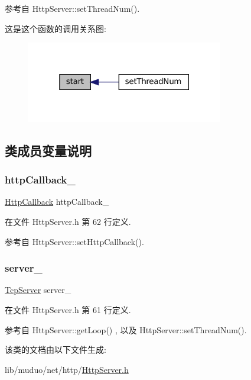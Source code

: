 参考自 Http\+Server\+::set\+Thread\+Num().

这是这个函数的调用关系图\+:
\nopagebreak
\begin{figure}[H]
\begin{center}
\leavevmode
\includegraphics[width=244pt]{classmuduo_1_1net_1_1HttpServer_a60de64d75454385b23995437f1d72669_icgraph}
\end{center}
\end{figure}


\subsection{类成员变量说明}
\mbox{\label{classmuduo_1_1net_1_1HttpServer_ab296b28a88834c853b076a5a25ba76a7}} 
\subsubsection{\texorpdfstring{http\+Callback\+\_\+}{httpCallback\_}}
{\footnotesize\ttfamily \hyperlink{classmuduo_1_1net_1_1HttpServer_ab343d6a3f751b7fb50940f92c64b6578}{Http\+Callback} http\+Callback\+\_\+\hspace{0.3cm}{\ttfamily [private]}}



在文件 Http\+Server.\+h 第 62 行定义.



参考自 Http\+Server\+::set\+Http\+Callback().

\mbox{\label{classmuduo_1_1net_1_1HttpServer_a5fa2c354b57a31cc2b5ed74583f853ad}} 
\subsubsection{\texorpdfstring{server\+\_\+}{server\_}}
{\footnotesize\ttfamily \hyperlink{classmuduo_1_1net_1_1TcpServer}{Tcp\+Server} server\+\_\+\hspace{0.3cm}{\ttfamily [private]}}



在文件 Http\+Server.\+h 第 61 行定义.



参考自 Http\+Server\+::get\+Loop() , 以及 Http\+Server\+::set\+Thread\+Num().



该类的文档由以下文件生成\+:\begin{DoxyCompactItemize}
\item 
lib/muduo/net/http/\hyperlink{HttpServer_8h}{Http\+Server.\+h}\end{DoxyCompactItemize}
